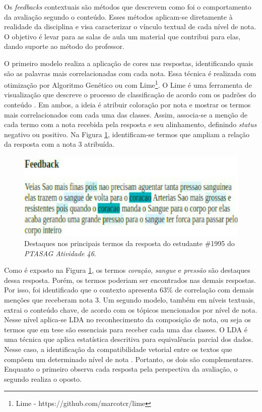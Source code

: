 Os \textit{feedbacks} contextuais são métodos que descrevem como foi o comportamento da avaliação segundo o conteúdo. Esses métodos aplicam-se diretamente à realidade da disciplina e visa caracterizar o vínculo textual de cada nível de nota. O objetivo é levar para as salas de aula um material que contribui para elas, dando suporte ao método do professor.

O primeiro modelo realiza a aplicação de cores nas respostas, identificando quais são as palavras mais correlacionadas com cada nota. Essa técnica é realizada com otimização por Algoritmo Genético \cite{spalenza2016a} ou com Lime\footnote{Lime - https://github.com/marcotcr/lime}. O Lime é uma ferramenta de visualização que descreve o processo de classificação de acordo com os padrões do conteúdo \cite{ribeiro2016}. Em ambos, a ideia é atribuir coloração por nota e mostrar os termos mais correlacionados com cada uma das classes. Assim, associa-se a menção de cada termo com a nota recebida pela resposta e seu alinhamento, definindo \textit{status} negativo ou positivo. Na Figura \ref{fig-highlight-46}, identificam-se termos que ampliam a relação da resposta com a nota 3 atribuída.

\begin{figure}[!h]
 \centering
 \includegraphics[width=.75\textwidth]{figuras/exemplo/highlight.jpeg}
 \caption{Destaques nos principais termos da resposta do estudante \#1995 do \textit{PTASAG Atividade 46}.}
 \label{fig-highlight-46}
\end{figure}

Como é exposto na Figura \ref{fig-highlight-46}, os termos \textit{coração}, \textit{sangue} e \textit{pressão} são destaques dessa resposta. Porém, os termos poderiam ser encontrados nas demais respostas. Por isso, foi identificado que o contexto apresenta 63\% de correlação com demais menções que receberam nota 3. Um segundo modelo, também em níveis textuais, extrai o conteúdo chave, de acordo com os tópicos mencionados por nível de nota. Nesse nível aplica-se LDA \cite{hoffman2013} no reconhecimento da composição de nota, ou seja os termos que em tese são essenciais para receber cada uma das classes. O LDA é uma técnica que aplica estatística descritiva para equivalência parcial dos dados. Nesse caso, a identificação da compatibilidade vetorial entre os textos que compõem um determinado nível de nota \cite{sahu2020}. Portanto, os dois são complementares. Enquanto o primeiro observa cada resposta pela perspectiva da avaliação, o segundo realiza o oposto. 

